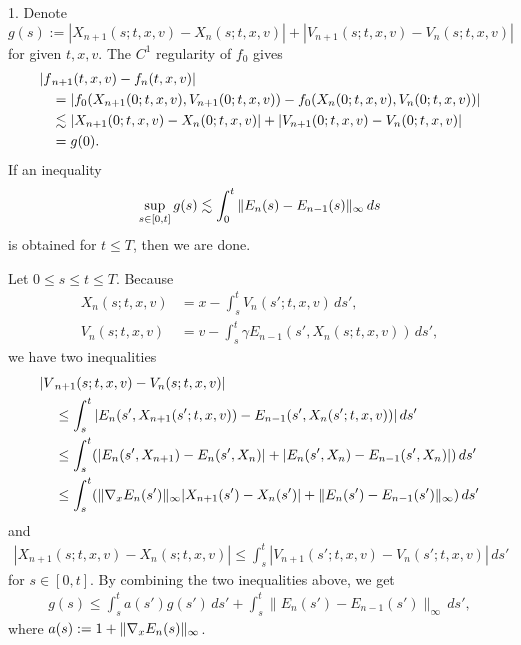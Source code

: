 \documentclass[11pt]{amsart}
\begin{document}
\begin{pf}
1.
Denote
\[g(s):=|X_{n+1}(s;t,x,v)-X_n(s;t,x,v)|+|V_{n+1}(s;t,x,v)-V_n(s;t,x,v)|\]
for given $t,x,v$.
The $C^1$ regularity of $f_0$ gives
\begin{align*}
|f&_{n+1}(t,x,v)-f_n(t,x,v)|\\
&=|f_0(X_{n+1}(0;t,x,v),V_{n+1}(0;t,x,v))-f_0(X_n(0;t,x,v),V_n(0;t,x,v))|\\
&\lesssim|X_{n+1}(0;t,x,v)-X_n(0;t,x,v)|+|V_{n+1}(0;t,x,v)-V_n(0;t,x,v)|\\
&=g(0).
\end{align*}
If an inequality
\[\sup_{s\in[0,t]}g(s)\lesssim\int_0^t\|E_n(s)-E_{n-1}(s)\|_\infty\,ds\]
is obtained for $t\le T$, then we are done.

Let $0\le s\le t\le T$.
Because
\begin{align*}
X_n(s;t,x,v)&=x-\int_s^tV_n(s';t,x,v)\,ds',\\
V_n(s;t,x,v)&=v-\int_s^t\gamma E_{n-1}(s',X_n(s;t,x,v))\,ds',
\end{align*}
we have two inequalities
\begin{align*}
|V&_{n+1}(s;t,x,v)-V_n(s;t,x,v)|\\
&\le\int_s^t|E_n(s',X_{n+1}(s';t,x,v))-E_{n-1}(s',X_n(s';t,x,v))|\,ds'\\
&\le\int_s^t(|E_n(s',X_{n+1})-E_n(s',X_n)|+|E_n(s',X_n)-E_{n-1}(s',X_n)|)\,ds'\\
&\le\int_s^t(\|\nabla_xE_n(s')\|_\infty|X_{n+1}(s')-X_n(s')|+\|E_n(s')-E_{n-1}(s')\|_\infty)\,ds'
\end{align*}
and
\begin{align*}
|X_{n+1}(s;t,x,v)-X_n(s;t,x,v)|\le\int_s^t|V_{n+1}(s';t,x,v)-V_n(s';t,x,v)|\,ds'
\end{align*}
for $s\in[0,t]$.
By combining the two inequalities above, we get
\begin{align}\label{ggw}
g(s)\le\int_s^ta(s')g(s')\,ds'+\int_s^t\|E_n(s')-E_{n-1}(s')\|_\infty\,ds',
\end{align}
where $a(s):=1+\|\nabla_xE_n(s)\|_\infty$.


\end{pf}
\end{document}

